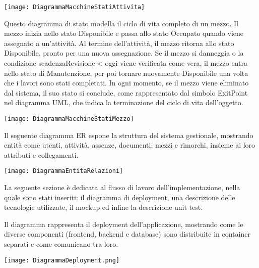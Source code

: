 \documentclass[a4paper]{report}
\begin{document}
\begin{figure*}[!ht]
    \centering
    \texttt{[image: DiagrammaMacchineStatiAttivita]}
\end{figure*}

\clearpage
{}
Questo diagramma di stato modella il ciclo di vita completo di un mezzo. Il mezzo inizia nello stato Disponibile e passa allo stato Occupato quando viene assegnato a un'attività. Al termine dell'attività, il mezzo ritorna allo stato Disponibile, pronto per una nuova assegnazione. Se il mezzo si danneggia o la condizione scadenzaRevisione < oggi viene verificata come vera, il mezzo entra nello stato di Manutenzione, per poi tornare nuovamente Disponibile una volta che i lavori sono stati completati. In ogni momento, se il mezzo viene eliminato dal sistema, il suo stato si conclude, come rappresentato dal simbolo ExitPoint nel diagramma UML, che indica la terminazione del ciclo di vita dell'oggetto.

\begin{figure*}[!ht]
    \centering
    \texttt{[image: DiagrammaMacchineStatiMezzo]}
\end{figure*}

\clearpage
{} 
Il seguente diagramma ER espone la struttura del sistema gestionale, mostrando entità come utenti, attività, assenze, documenti, mezzi e rimorchi, insieme ai loro attributi e collegamenti.

\begin{figure*}[!ht]
    \centering
    \texttt{[image: DiagrammaEntitaRelazioni]}
\end{figure*}

La seguente sezione è dedicata al flusso di lavoro dell’implementazione, nella quale sono stati
inseriti: il diagramma di deployment, una descrizione delle tecnologie utilizzate, il mockup ed
infine la descrizione unit test.

Il diagramma rappresenta il deployment dell’applicazione, mostrando come le diverse componenti (frontend, backend e database) sono distribuite in container separati e come comunicano tra loro.

\begin{figure*}[!ht]
    \centering
    \texttt{[image: DiagrammaDeployment.png]}
\end{figure*}
\end{document}

